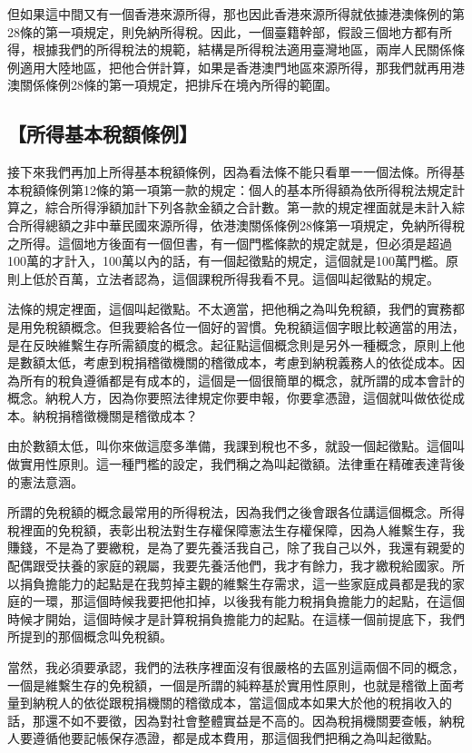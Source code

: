 \documentclass[]{ctexbook}
\begin{document}
但如果這中間又有一個香港來源所得，那也因此香港來源所得就依據港澳條例的第28條的第一項規定，則免納所得稅。因此，一個臺籍幹部，假設三個地方都有所得，根據我們的所得稅法的規範，結構是所得稅法適用臺灣地區，兩岸人民關係條例適用大陸地區，把他合併計算，如果是香港澳門地區來源所得，那我們就再用港澳關係條例28條的第一項規定，把排斥在境內所得的範圍。

\hypertarget{ux6240ux5f97ux57faux672cux7a05ux984dux689dux4f8b}{%
\subsection{【所得基本稅額條例】}\label{ux6240ux5f97ux57faux672cux7a05ux984dux689dux4f8b}}

接下來我們再加上所得基本稅額條例，因為看法條不能只看單一一個法條。所得基本稅額條例第12條的第一項第一款的規定：個人的基本所得額為依所得稅法規定計算之，綜合所得淨額加計下列各款金額之合計數。第一款的規定裡面就是未計入綜合所得總額之非中華民國來源所得，依港澳關係條例28條第一項規定，免納所得稅之所得。這個地方後面有一個但書，有一個門檻條款的規定就是，但必須是超過100萬的才計入，100萬以內的話，有一個起徵點的規定，這個就是100萬門檻。原則上低於百萬，立法者認為，這個課稅所得我看不見。這個叫起徵點的規定。

法條的規定裡面，這個叫起徵點。不太適當，把他稱之為叫免稅額，我們的實務都是用免稅額概念。但我要給各位一個好的習慣。免稅額這個字眼比較適當的用法，是在反映維繫生存所需額度的概念。起征點這個概念則是另外一種概念，原則上他是數額太低，考慮到稅捐稽徵機關的稽徵成本，考慮到納稅義務人的依從成本。因為所有的稅負遵循都是有成本的，這個是一個很簡單的概念，就所謂的成本會計的概念。納稅人方，因為你要照法律規定你要申報，你要拿憑證，這個就叫做依從成本。納稅捐稽徵機關是稽徵成本？

由於數額太低，叫你來做這麼多準備，我課到稅也不多，就設一個起徵點。這個叫做實用性原則。這一種門檻的設定，我們稱之為叫起徵額。法律重在精確表達背後的憲法意涵。

所謂的免稅額的概念最常用的所得稅法，因為我們之後會跟各位講這個概念。所得稅裡面的免稅額，表彰出稅法對生存權保障憲法生存權保障，因為人維繫生存，我賺錢，不是為了要繳稅，是為了要先養活我自己，除了我自己以外，我還有親愛的配偶跟受扶養的家庭的親屬，我要先養活他們，我才有餘力，我才繳稅給國家。所以捐負擔能力的起點是在我剪掉主觀的維繫生存需求，這一些家庭成員都是我的家庭的一環，那這個時候我要把他扣掉，以後我有能力稅捐負擔能力的起點，在這個時候才開始，這個時候才是計算稅捐負擔能力的起點。在這樣一個前提底下，我們所提到的那個概念叫免稅額。

當然，我必須要承認，我們的法秩序裡面沒有很嚴格的去區別這兩個不同的概念，一個是維繫生存的免稅額，一個是所謂的純粹基於實用性原則，也就是稽徵上面考量到納稅人的依從跟稅捐機關的稽徵成本，當這個成本如果大於他的稅捐收入的話，那還不如不要徵，因為對社會整體實益是不高的。因為稅捐機關要查帳，納稅人要遵循他要記帳保存憑證，都是成本費用，那這個我們把稱之為叫起徵點。
\end{document}
